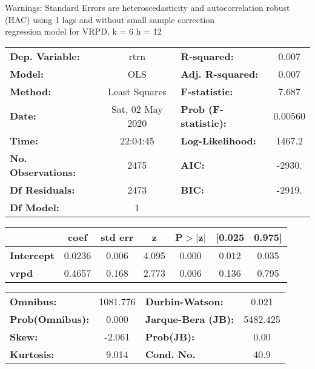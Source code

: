 Warnings: \newline
 [1] Standard Errors are heteroscedasticity and autocorrelation robust (HAC) using 1 lags and without small sample correction\\ 

regression model for VRPD, k = 6 h = 12\begin{center}
\begin{tabular}{lclc}
\toprule
\textbf{Dep. Variable:}    &       rtrn       & \textbf{  R-squared:         } &     0.007   \\
\textbf{Model:}            &       OLS        & \textbf{  Adj. R-squared:    } &     0.007   \\
\textbf{Method:}           &  Least Squares   & \textbf{  F-statistic:       } &     7.687   \\
\textbf{Date:}             & Sat, 02 May 2020 & \textbf{  Prob (F-statistic):} &  0.00560    \\
\textbf{Time:}             &     22:04:45     & \textbf{  Log-Likelihood:    } &    1467.2   \\
\textbf{No. Observations:} &        2475      & \textbf{  AIC:               } &    -2930.   \\
\textbf{Df Residuals:}     &        2473      & \textbf{  BIC:               } &    -2919.   \\
\textbf{Df Model:}         &           1      & \textbf{                     } &             \\
\bottomrule
\end{tabular}
\begin{tabular}{lcccccc}
                   & \textbf{coef} & \textbf{std err} & \textbf{z} & \textbf{P$> |$z$|$} & \textbf{[0.025} & \textbf{0.975]}  \\
\midrule
\textbf{Intercept} &       0.0236  &        0.006     &     4.095  &         0.000        &        0.012    &        0.035     \\
\textbf{vrpd}      &       0.4657  &        0.168     &     2.773  &         0.006        &        0.136    &        0.795     \\
\bottomrule
\end{tabular}
\begin{tabular}{lclc}
\textbf{Omnibus:}       & 1081.776 & \textbf{  Durbin-Watson:     } &    0.021  \\
\textbf{Prob(Omnibus):} &   0.000  & \textbf{  Jarque-Bera (JB):  } & 5482.425  \\
\textbf{Skew:}          &  -2.061  & \textbf{  Prob(JB):          } &     0.00  \\
\textbf{Kurtosis:}      &   9.014  & \textbf{  Cond. No.          } &     40.9  \\
\bottomrule
\end{tabular}
\end{center}

